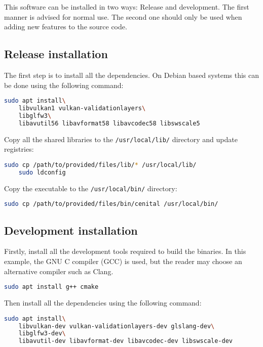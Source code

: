\documentclass[../main.tex]{subfiles}
\begin{document}
This software can be installed in two ways: Release and development. The first manner is advised for normal use. The second one should only be used when adding new features to the source code.\newline

\subsection{Release installation}

The first step is to install all the dependencies. On Debian based systems this can be done using the following command:

\begin{lstlisting}[language=bash]
    sudo apt install\
    libvulkan1 vulkan-validationlayers\
    libglfw3\
    libavutil56 libavformat58 libavcodec58 libswscale5
\end{lstlisting}

Copy all the shared libraries to the \texttt{/usr/local/lib/} directory and update registries:

\begin{lstlisting}[language=bash]
    sudo cp /path/to/provided/files/lib/* /usr/local/lib/
    sudo ldconfig
\end{lstlisting}

Copy the executable to the \texttt{/usr/local/bin/} directory:

\begin{lstlisting}[language=bash]
    sudo cp /path/to/provided/files/bin/cenital /usr/local/bin/
\end{lstlisting}


\subsection{Development installation}

Firstly, install all the development tools required to build the binaries. In this example, the GNU C compiler (GCC) is used, but the reader may choose an alternative compiler such as Clang.\newline

\begin{lstlisting}[language=bash]
    sudo apt install g++ cmake
\end{lstlisting}

Then install all the dependencies using the following command:

\begin{lstlisting}[language=bash]
    sudo apt install\
    libvulkan-dev vulkan-validationlayers-dev glslang-dev\
    libglfw3-dev\
    libavutil-dev libavformat-dev libavcodec-dev libswscale-dev
\end{lstlisting}
\end{document}
